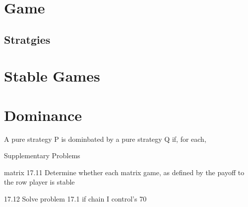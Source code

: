 
\section{Game}


\subsection{Stratgies}
 


\section{Stable Games}





\section{Dominance}

A pure strategy P is dominbated by a pure strategy Q if, for each,

















Supplementary Problems


matrix
17.11 
Determine whether each matrix game, as defined by the payoff to the row player is stable



17.12 Solve problem 17.1 if chain I control's 70%

